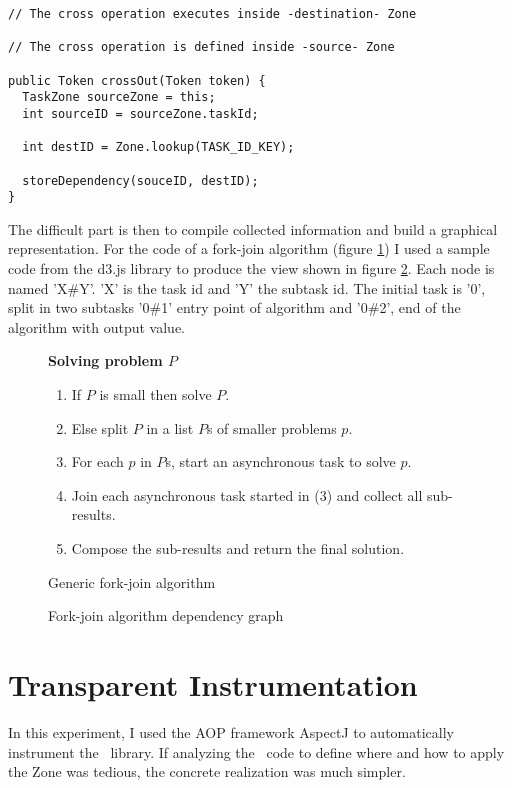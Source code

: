 \begin{lstlisting}
// The cross operation executes inside -destination- Zone

// The cross operation is defined inside -source- Zone

public Token crossOut(Token token) {
  TaskZone sourceZone = this;
  int sourceID = sourceZone.taskId;

  int destID = Zone.lookup(TASK_ID_KEY);

  storeDependency(souceID, destID);
}
\end{lstlisting}

The difficult part is then to compile collected information and build a graphical representation. For the code of a fork-join algorithm (figure \ref{fig:fj-alg}) I used a sample code from the d3.js library to produce the view shown in figure \ref{fig:fjt-bundle}. Each node is named 'X\#Y'. 'X' is the task id and 'Y' the subtask id. The initial task is '0', split in two subtasks '0\#1' entry point of algorithm and '0\#2', end of the algorithm with output value.

\begin{figure}[h]
  \textbf{Solving problem $P$}
  \begin{enumerate}
  \item If $P$ is small then solve $P$.
  \item Else split $P$ in a list $P$s of smaller problems $p$.
  \item For each $p$ in $P$s, start an asynchronous task to solve $p$.
  \item Join each asynchronous task started in (3) and collect all sub-results.
  \item Compose the sub-results and return the final solution.
  \end{enumerate}
\caption{Generic fork-join algorithm}
\label{fig:fj-alg}
\end{figure}

\begin{figure}
  \centering
  \caption{Fork-join algorithm dependency graph}
  \label{fig:fjt-bundle}
\end{figure}


\section{Transparent Instrumentation}

In this experiment, I used the AOP framework AspectJ to automatically instrument the \vertx\ library. If analyzing the \vertx\ code to define where and how to apply the Zone was tedious, the concrete realization was much simpler.


